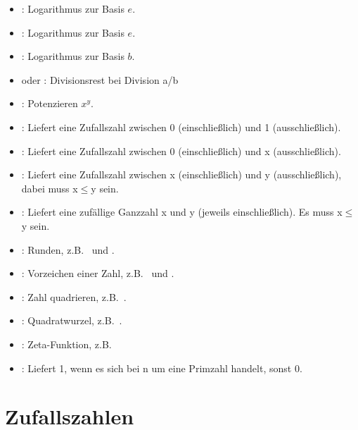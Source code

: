 \begin{itemize}
\item
{}:
Logarithmus zur Basis $e$.

\item
{}:
Logarithmus zur Basis $e$.

\item
{}:
Logarithmus zur Basis $b$.

\item
{} oder :
Divisionsrest bei Division a/b

\item
{}:
Potenzieren $x^y$.

\item
{}:
Liefert eine Zufallszahl zwischen 0 (einschließlich) und 1 (ausschließlich).

\item
{}:
Liefert eine Zufallszahl zwischen 0 (einschließlich) und x (ausschließlich).

\item
{}:
Liefert eine Zufallszahl zwischen x (einschließlich) und y (ausschließlich), dabei muss x$\le$y sein.

\item
{}:
Liefert eine zufällige Ganzzahl x und y (jeweils einschließlich). Es muss x$\leq$y sein.

\item
{}:
Runden, z.B.\  und .

\item
{}:
Vorzeichen einer Zahl, z.B.\  und .

\item
{}:
Zahl quadrieren, z.B.\ .

\item
{}:
Quadratwurzel, z.B.\ .

\item
{}:
Zeta-Funktion, z.B.\ 

\item
{}:
Liefert 1, wenn es sich bei n um eine Primzahl handelt, sonst 0.

\end{itemize}



\section{Zufallszahlen}

